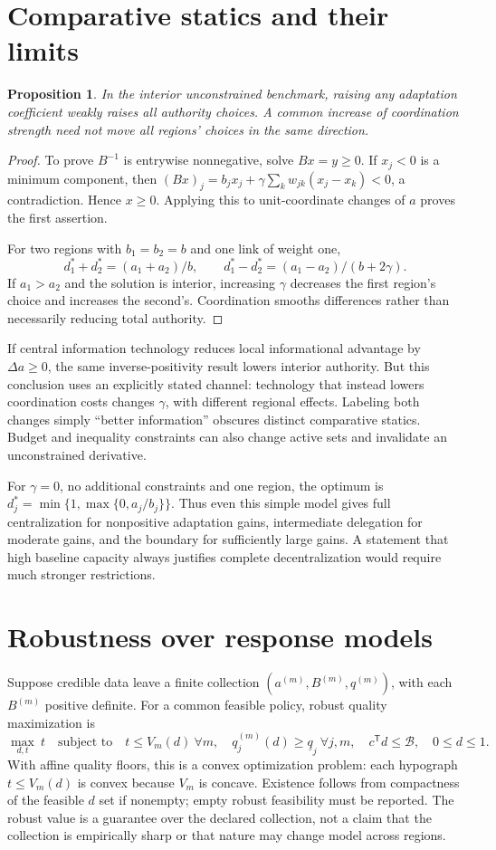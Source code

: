 \documentclass[11pt]{article}
\newtheorem{proposition}{Proposition}
\begin{document}
\section*{Comparative statics and their limits}
\begin{proposition}
In the interior unconstrained benchmark, raising any adaptation coefficient weakly raises all authority choices. A common increase of coordination strength need not move all regions' choices in the same direction.
\end{proposition}
\begin{proof}
To prove $B^{-1}$ is entrywise nonnegative, solve $Bx=y\geq0$. If $x_j<0$ is a minimum component, then $(Bx)_j=b_jx_j+\gamma\sum_kw_{jk}(x_j-x_k)<0$, a contradiction. Hence $x\geq0$. Applying this to unit-coordinate changes of $a$ proves the first assertion.

For two regions with $b_1=b_2=b$ and one link of weight one,
\[
 d_1^*+d_2^*=(a_1+a_2)/b,\qquad
 d_1^*-d_2^*=(a_1-a_2)/(b+2\gamma).
\]
If $a_1>a_2$ and the solution is interior, increasing $\gamma$ decreases the first region's choice and increases the second's. Coordination smooths differences rather than necessarily reducing total authority.
\end{proof}

If central information technology reduces local informational advantage by $\Delta a\geq0$, the same inverse-positivity result lowers interior authority. But this conclusion uses an explicitly stated channel: technology that instead lowers coordination costs changes $\gamma$, with different regional effects. Labeling both changes simply ``better information'' obscures distinct comparative statics. Budget and inequality constraints can also change active sets and invalidate an unconstrained derivative.

For $\gamma=0$, no additional constraints and one region, the optimum is
$d_j^*=\min\{1,\max\{0,a_j/b_j\}\}$. Thus even this simple model gives full centralization for nonpositive adaptation gains, intermediate delegation for moderate gains, and the boundary for sufficiently large gains. A statement that high baseline capacity always justifies complete decentralization would require much stronger restrictions.

\section*{Robustness over response models}
Suppose credible data leave a finite collection $(a^{(m)},B^{(m)},q^{(m)})$, with each $B^{(m)}$ positive definite. For a common feasible policy, robust quality maximization is
\[
 \max_{d,t}\ t\quad\text{subject to}\quad
 t\leq V_m(d)\ \forall m,
 \quad q^{(m)}_j(d)\geq\underline q_j\ \forall j,m,
 \quad c^{\mathsf T}d\leq\mathcal B,\quad0\leq d\leq1.
\]
With affine quality floors, this is a convex optimization problem: each hypograph $t\leq V_m(d)$ is convex because $V_m$ is concave. Existence follows from compactness of the feasible $d$ set if nonempty; empty robust feasibility must be reported. The robust value is a guarantee over the declared collection, not a claim that the collection is empirically sharp or that nature may change model across regions.
\end{document}

